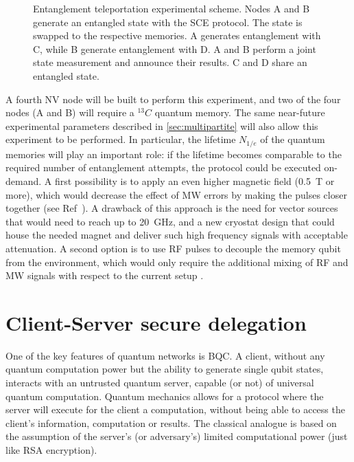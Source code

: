 \documentclass[a4paper, twoside]{article}
\begin{document}
\begin{figure}
	\caption{Entanglement teleportation experimental scheme. Nodes A and B generate an entangled state with the \ac{SCE} protocol. The state is swapped to the respective memories. A generates entanglement with C, while B generate entanglement with D. A and B perform a joint state measurement and announce their results. C and D share an entangled state. }
	\label{fig:ent_teleport}
\end{figure}

A fourth NV node will be built to perform this experiment, and two of the four nodes (A and B) will require a ${}^{13}C$ quantum memory. The same near-future experimental parameters described in \autoref{sec:multipartite} will also allow this experiment to be performed. In particular, the lifetime $N_{1/e}$ of the quantum memories will play an important role: if the lifetime becomes comparable to the required number of entanglement attempts, the protocol could be executed on-demand. A first possibility is to apply an even higher magnetic field (\SI{0.5}{T} or more), which would decrease the effect of \ac{MW} errors by making the pulses closer together (see Ref~\cite{Kalb2017}). A drawback of this approach is the need for vector sources that would need to reach up to \SI{20}{GHz}, and a new cryostat design that could house the needed magnet and deliver such high frequency signals with acceptable attenuation.
A second option is to use \ac{RF} pulses to decouple the memory qubit from the environment, which would only require the additional mixing of \ac{RF} and \ac{MW} signals with respect to the current setup \cite{Bradley2018}. 

\section{Client-Server secure delegation}
\label{sec:delegation}

One of the key features of quantum networks is \ac{BQC}. A client, without any quantum computation power but the ability to generate single qubit states, interacts with an untrusted quantum server, capable (or not) of universal quantum computation. Quantum mechanics allows for a protocol where the server will execute for the client a computation, without being able to access the client's information, computation or results. The classical analogue is based on the assumption of the server's (or adversary's) limited computational power (just like RSA encryption).
\end{document}
